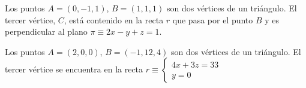 \documentclass[addpoints,spanish, 12pt,a4paper]{exam}
\begin{document}
\begin{questions}


\hline


\question Los puntos $A= (0,-1,1)$, $B= (1,1,1)$ son dos vértices de un triángulo. El tercer vértice, $C$, está contenido en la recta $r$ que pasa por el punto $B$ y es perpendicular al plano $\pi \equiv 2x - y + z = 1$. 

\question Los puntos $A = (2, 0, 0)$, $B = (-1, 12, 4)$ son dos vértices de un triángulo. El tercer vértice se encuentra en la recta $r\equiv \left\{\begin{matrix}
    4x+3z= 33 \\
    y=0
\end{matrix}\right.$
\end{questions}
\end{document}
